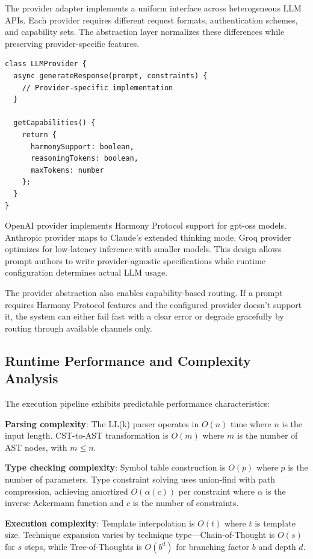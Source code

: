 \documentclass[11pt,a4paper]{article}
\begin{document}
The provider adapter implements a uniform interface across heterogeneous LLM APIs. Each provider requires different request formats, authentication schemes, and capability sets. The abstraction layer normalizes these differences while preserving provider-specific features.

\begin{lstlisting}[caption=Provider interface]
class LLMProvider {
  async generateResponse(prompt, constraints) {
    // Provider-specific implementation
  }

  getCapabilities() {
    return {
      harmonySupport: boolean,
      reasoningTokens: boolean,
      maxTokens: number
    };
  }
}
\end{lstlisting}

OpenAI provider implements Harmony Protocol support for gpt-oss models. Anthropic provider maps to Claude's extended thinking mode. Groq provider optimizes for low-latency inference with smaller models. This design allows prompt authors to write provider-agnostic specifications while runtime configuration determines actual LLM usage.

The provider abstraction also enables capability-based routing. If a prompt requires Harmony Protocol features and the configured provider doesn't support it, the system can either fail fast with a clear error or degrade gracefully by routing through available channels only.

\subsection{Runtime Performance and Complexity Analysis}

The execution pipeline exhibits predictable performance characteristics:

\textbf{Parsing complexity}: The LL(k) parser operates in $O(n)$ time where $n$ is the input length. CST-to-AST transformation is $O(m)$ where $m$ is the number of AST nodes, with $m \leq n$.

\textbf{Type checking complexity}: Symbol table construction is $O(p)$ where $p$ is the number of parameters. Type constraint solving uses union-find with path compression, achieving amortized $O(\alpha(c))$ per constraint where $\alpha$ is the inverse Ackermann function and $c$ is the number of constraints.

\textbf{Execution complexity}: Template interpolation is $O(t)$ where $t$ is template size. Technique expansion varies by technique type—Chain-of-Thought is $O(s)$ for $s$ steps, while Tree-of-Thoughts is $O(b^d)$ for branching factor $b$ and depth $d$.
\end{document}
